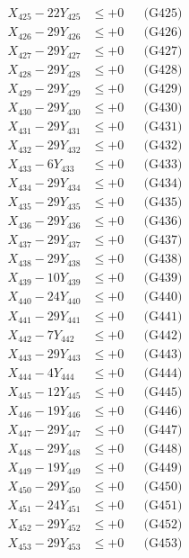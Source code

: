\documentclass[a4paper,10pt]{article}
\begin{document}
{\begin{align}
X_{425} - 22Y_{425} &\leq +0 && \text{(G425)} \\
X_{426} - 29Y_{426} &\leq +0 && \text{(G426)} \\
X_{427} - 29Y_{427} &\leq +0 && \text{(G427)} \\
X_{428} - 29Y_{428} &\leq +0 && \text{(G428)} \\
X_{429} - 29Y_{429} &\leq +0 && \text{(G429)} \\
X_{430} - 29Y_{430} &\leq +0 && \text{(G430)} \\
\allowbreak
X_{431} - 29Y_{431} &\leq +0 && \text{(G431)} \\
X_{432} - 29Y_{432} &\leq +0 && \text{(G432)} \\
X_{433} - 6Y_{433} &\leq +0 && \text{(G433)} \\
X_{434} - 29Y_{434} &\leq +0 && \text{(G434)} \\
X_{435} - 29Y_{435} &\leq +0 && \text{(G435)} \\
X_{436} - 29Y_{436} &\leq +0 && \text{(G436)} \\
X_{437} - 29Y_{437} &\leq +0 && \text{(G437)} \\
X_{438} - 29Y_{438} &\leq +0 && \text{(G438)} \\
X_{439} - 10Y_{439} &\leq +0 && \text{(G439)} \\
X_{440} - 24Y_{440} &\leq +0 && \text{(G440)} \\
\allowbreak
X_{441} - 29Y_{441} &\leq +0 && \text{(G441)} \\
X_{442} - 7Y_{442} &\leq +0 && \text{(G442)} \\
X_{443} - 29Y_{443} &\leq +0 && \text{(G443)} \\
X_{444} - 4Y_{444} &\leq +0 && \text{(G444)} \\
X_{445} - 12Y_{445} &\leq +0 && \text{(G445)} \\
X_{446} - 19Y_{446} &\leq +0 && \text{(G446)} \\
X_{447} - 29Y_{447} &\leq +0 && \text{(G447)} \\
X_{448} - 29Y_{448} &\leq +0 && \text{(G448)} \\
X_{449} - 19Y_{449} &\leq +0 && \text{(G449)} \\
X_{450} - 29Y_{450} &\leq +0 && \text{(G450)} \\
\allowbreak
X_{451} - 24Y_{451} &\leq +0 && \text{(G451)} \\
X_{452} - 29Y_{452} &\leq +0 && \text{(G452)} \\
X_{453} - 29Y_{453} &\leq +0 && \text{(G453)} \\

\end{align}}
\end{document}
